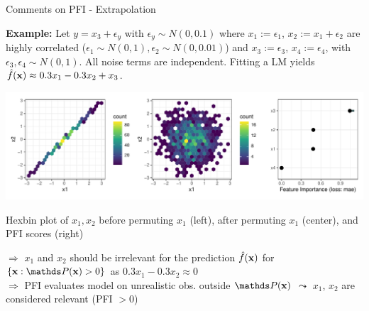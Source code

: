 \documentclass[11pt,compress,t,notes=noshow, aspectratio=169, xcolor=table]{beamer}
\begin{document}
\begin{frame}{Comments on PFI - Extrapolation}
 
 
 \textbf{Example:} Let $y = x_3 + \epsilon_y$ with $\epsilon_y \sim N(0, 0.1)$ where $x_1 :=  \epsilon_1$, $x_2 := x_1 + \epsilon_2$ are highly correlated ($\epsilon_1 \sim N(0,1), \epsilon_2 \sim N(0, 0.01)$) and $x_3 := \epsilon_3$, $x_4 := \epsilon_4$,  with $\epsilon_3, \epsilon_4 \sim N(0,1)$. All noise terms are independent.
 Fitting a LM yields $\fh(\xv) \approx 0.3 x_1 - 0.3 x_2 + x_3$.
\pause

\centerline{\includegraphics[width=0.9\linewidth]{figure_man/pfi_hexbin_extrapolation.pdf}}
\centerline{Hexbin plot of $x_1, x_2$ before permuting $x_1$ (left), after permuting $x_1$ (center), and PFI scores (right)}
\lz\pause
% 
$\Rightarrow$ $x_1$ and $x_2$ should be irrelevant for the prediction $\fh(\xv)$ for $\{\xv: \P(\xv) > 0\}$ as $0.3 x_1 - 0.3 x_2 \approx 0$ \\
$\Rightarrow$ PFI evaluates model on unrealistic obs. outside $\P(\xv)$ $\leadsto$ $x_1$, $x_2$ are considered relevant (PFI $> 0$)

\end{frame}
\end{document}
